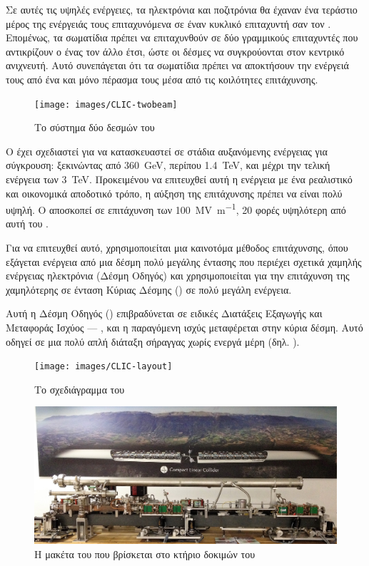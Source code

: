 Σε αυτές τις υψηλές ενέργειες, τα ηλεκτρόνια και ποζιτρόνια θα έχαναν ένα τεράστιο μέρος της ενέργειάς τους επιταχυνόμενα σε έναν κυκλικό επιταχυντή σαν τον . 
Επομένως, τα σωματίδια πρέπει να επιταχυνθούν σε δύο γραμμικούς επιταχυντές που αντικρίζουν ο ένας τον άλλο έτσι, ώστε οι δέσμες να συγκρούονται στον κεντρικό ανιχνευτή. 
Αυτό συνεπάγεται ότι τα σωματίδια πρέπει να αποκτήσουν την ενέργειά τους από ένα και μόνο πέρασμα τους μέσα από τις κοιλότητες επιτάχυνσης.

\begin{figure}[tph]
\texttt{[image: images/CLIC-twobeam]}
\centering
\caption{Το σύστημα δύο δεσμών του }
\label{img:CLICtwobeamscheme}
\end{figure}

Ο  έχει σχεδιαστεί για να κατασκευαστεί σε στάδια αυξανόμενης ενέργειας για σύγκρουση: ξεκινώντας από \SI{360}{\giga \electronvolt}, περίπου \SI{1.4}{\TeV}, και μέχρι την τελική ενέργεια των \SI{3}{\TeV}. 
Προκειμένου να επιτευχθεί αυτή η ενέργεια με ένα ρεαλιστικό και οικονομικά αποδοτικό τρόπο, η αύξηση της επιτάχυνσης πρέπει να είναι πολύ υψηλή.
Ο  αποσκοπεί σε επιτάχυνση των \SI[per-mode = symbol]{100}{\mega \volt \per \metre}, 20 φορές υψηλότερη από αυτή του .

Για να επιτευχθεί αυτό, χρησιμοποιείται μια καινοτόμα μέθοδος επιτάχυνσης, όπου εξάγεται ενέργεια από μια δέσμη πολύ μεγάλης έντασης που περιέχει σχετικά χαμηλής ενέργειας ηλεκτρόνια (Δέσμη Οδηγός) και χρησιμοποιείται για την επιτάχυνση της χαμηλότερης σε ένταση Κύριας Δέσμης () σε πολύ μεγάλη ενέργεια.

Αυτή η Δέσμη Οδηγός () επιβραδύνεται σε ειδικές Διατάξεις Εξαγωγής και Mεταφοράς Ισχύος --- , και η παραγόμενη  ισχύς μεταφέρεται στην κύρια δέσμη. 
Αυτό οδηγεί σε μια πολύ απλή διάταξη σήραγγας χωρίς ενεργά  μέρη (δηλ. ).

\begin{figure}[tph]
\texttt{[image: images/CLIC-layout]}
\centering
\caption{Το σχεδιάγραμμα του }
\label{img:CLIClayout}
\end{figure}

\begin{figure}[tph]
\includegraphics[width=\linewidth]{images/CLIC-maquette}
\centering
\caption[Η μακέτα του ]{Η μακέτα του  που βρίσκεται στο κτήριο δοκιμών  του }
\label{img:CLIClmaquette}
\end{figure}

